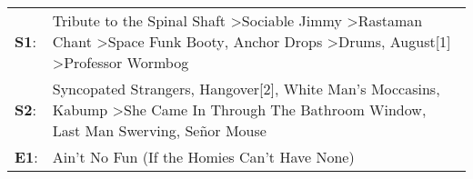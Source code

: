 \begin{supertabular}{p{0.03\textwidth}p{0.92\textwidth}}
 \textbf{S1}:  &  Tribute to the Spinal Shaft\textsuperscript{} \textgreater \enspace Sociable Jimmy\textsuperscript{} \textgreater \enspace Rastaman Chant\textsuperscript{} \textgreater \enspace Space Funk Booty\textsuperscript{}, \enspace Anchor Drops\textsuperscript{} \textgreater \enspace Drums\textsuperscript{}, \enspace August[1]\textsuperscript{} \textgreater \enspace Professor Wormbog\textsuperscript{}  \enspace  \\
 \textbf{S2}:  &                                                                    Syncopated Strangers\textsuperscript{}, \enspace Hangover[2]\textsuperscript{}, \enspace White Man's Moccasins\textsuperscript{}, \enspace Kabump\textsuperscript{} \textgreater \enspace She Came In Through The Bathroom Window\textsuperscript{}, \enspace Last Man Swerving\textsuperscript{}, \enspace Señor Mouse\textsuperscript{}  \enspace  \\
 \textbf{E1}:  &                                                                                                                                                                                                                                                                                                                                               Ain't No Fun (If the Homies Can't Have None)\textsuperscript{}  \enspace  \\
\end{supertabular}
